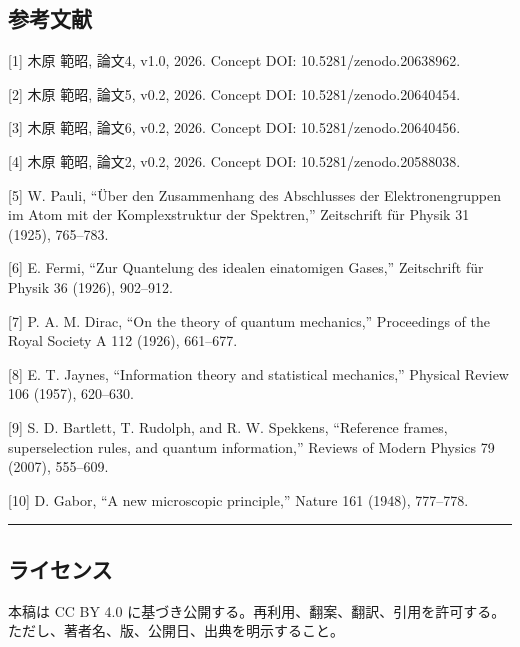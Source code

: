 \documentclass[
]{ltjsarticle}
\begin{document}
\subsection{参考文献}\label{ux53c2ux8003ux6587ux732e}

{[}1{]} 木原 範昭, 論文4, v1.0, 2026. Concept DOI:
10.5281/zenodo.20638962.

{[}2{]} 木原 範昭, 論文5, v0.2, 2026. Concept DOI:
10.5281/zenodo.20640454.

{[}3{]} 木原 範昭, 論文6, v0.2, 2026. Concept DOI:
10.5281/zenodo.20640456.

{[}4{]} 木原 範昭, 論文2, v0.2, 2026. Concept DOI:
10.5281/zenodo.20588038.

{[}5{]} W. Pauli, ``Über den Zusammenhang des Abschlusses der
Elektronengruppen im Atom mit der Komplexstruktur der Spektren,''
Zeitschrift für Physik 31 (1925), 765--783.

{[}6{]} E. Fermi, ``Zur Quantelung des idealen einatomigen Gases,''
Zeitschrift für Physik 36 (1926), 902--912.

{[}7{]} P. A. M. Dirac, ``On the theory of quantum mechanics,''
Proceedings of the Royal Society A 112 (1926), 661--677.

{[}8{]} E. T. Jaynes, ``Information theory and statistical mechanics,''
Physical Review 106 (1957), 620--630.

{[}9{]} S. D. Bartlett, T. Rudolph, and R. W. Spekkens, ``Reference
frames, superselection rules, and quantum information,'' Reviews of
Modern Physics 79 (2007), 555--609.

{[}10{]} D. Gabor, ``A new microscopic principle,'' Nature 161 (1948),
777--778.

\begin{center}\rule{0.5\linewidth}{0.5pt}\end{center}

\subsection{ライセンス}\label{ux30e9ux30a4ux30bbux30f3ux30b9}

本稿は CC BY 4.0
に基づき公開する。再利用、翻案、翻訳、引用を許可する。ただし、著者名、版、公開日、出典を明示すること。
\end{document}
